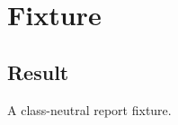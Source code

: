 \documentclass{report}
\begin{document}
\chapter{Fixture}
\section{Result}
\begin{apodefinition}A class-neutral report fixture.\end{apodefinition}
\end{document}
